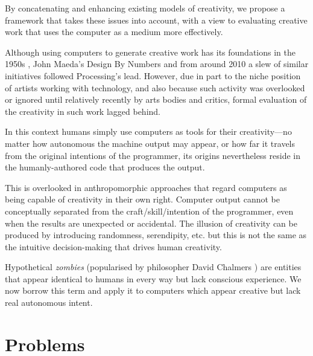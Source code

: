 By concatenating and enhancing existing models of creativity, \colorbox{red!30}{we} propose a framework that takes these issues into account, with a view to evaluating creative work that uses the computer as a medium more effectively.

\spirals

Although using computers to generate creative work has its foundations in the 1950s \autocite{Candy2011}, John Maeda's Design By Numbers \autocite{Maeda2001} and from around 2010 a slew of similar initiatives followed Processing's lead. However, due in part to the niche position of artists working with technology, and also because such activity was overlooked or ignored until relatively recently by arts bodies and critics, formal evaluation of the creativity in such work lagged behind.

In this context humans simply use computers as tools for their creativity---no matter how autonomous the machine output may appear, or how far it travels from the original intentions of the programmer, its origins nevertheless reside in the humanly-authored code that produces the output.

This is overlooked in anthropomorphic approaches that regard computers as being capable of creativity in their own right. Computer output cannot be conceptually separated from the craft/skill/intention of the programmer, even when the results are unexpected or accidental. The illusion of creativity can be produced by introducing randomness, serendipity, etc. but this is not the same as the intuitive decision-making that drives human creativity.

Hypothetical \emph{zombies} (popularised by philosopher David Chalmers \autocite{Chalmers1996}) are entities that appear identical to humans in every way but lack conscious experience. \colorbox{red!30}{We} now borrow this term and apply it to computers which appear creative but lack real autonomous intent.


\section{Problems}


